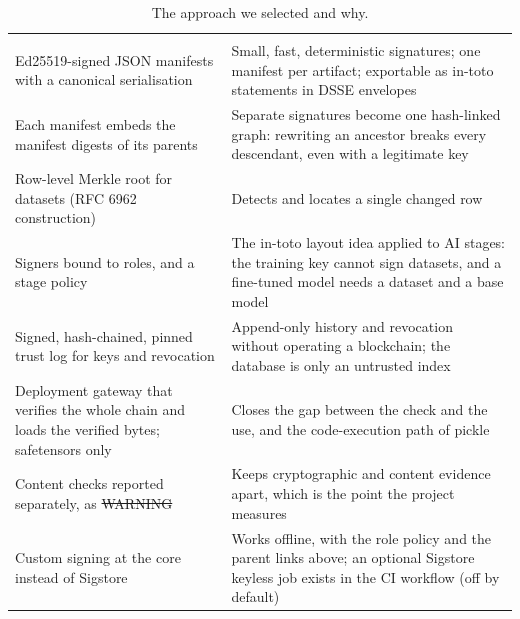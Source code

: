 {\tablefont
\begin{xltabular}{\textwidth}{P{5.6cm}L}
\caption{The approach we selected and why.}\label{tab:choices}\\
\toprule
\headrow{} &  \\
\midrule
\endfirsthead
\toprule
\headrow{} &  \\
\midrule
\endhead
\bottomrule
\endfoot
Ed25519-signed JSON manifests with a canonical serialisation & Small, fast, deterministic signatures; one manifest per artifact; exportable as in-toto statements in DSSE envelopes \\
Each manifest embeds the manifest digests of its parents & Separate signatures become one hash-linked graph: rewriting an ancestor breaks every descendant, even with a legitimate key \\
Row-level Merkle root for datasets (RFC 6962 construction) & Detects and locates a single changed row \\
Signers bound to roles, and a stage policy & The in-toto layout idea applied to AI stages: the training key cannot sign datasets, and a fine-tuned model needs a dataset and a base model \\
Signed, hash-chained, pinned trust log for keys and revocation & Append-only history and revocation without operating a blockchain; the database is only an untrusted index \\
Deployment gateway that verifies the whole chain and loads the verified bytes; safetensors only & Closes the gap between the check and the use, and the code-execution path of pickle \\
Content checks reported separately, as \st{WARNING} & Keeps cryptographic and content evidence apart, which is the point the project measures \\
Custom signing at the core instead of Sigstore & Works offline, with the role policy and the parent links above; an optional Sigstore keyless job exists in the CI workflow (off by default) \\
\end{xltabular}}
